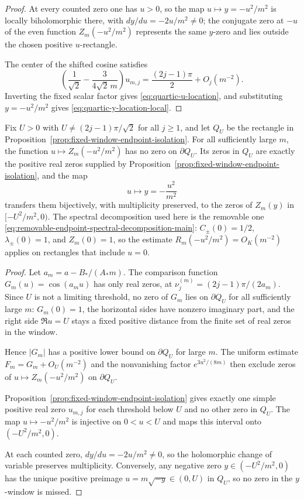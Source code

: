 \begin{proof}
At every counted zero one has $u>0$, so the map $u\mapsto y=-u^2/m^2$ is locally biholomorphic there, with $dy/du=-2u/m^2\ne0$; the conjugate zero at $-u$ of the even function $Z_m(-u^2/m^2)$ represents the same $y$-zero and lies outside the chosen positive $u$-rectangle.

The center of the shifted cosine satisfies
\[
\left(\frac1{\sqrt2}-\frac{3}{4\sqrt2\,m}\right)u_{m,j}
=
\frac{(2j-1)\pi}{2}+O_j(m^{-2}).
\]
Inverting the fixed scalar factor gives \eqref{eq:quartic-u-location}, and substituting $y=-u^2/m^2$ gives \eqref{eq:quartic-y-location-local}.\label{par:endpoint-theorem-inputs}
\end{proof}

\begin{lemma}\label{lem:endpoint-boundary-transfer}
Fix $U>0$ with $U\ne (2j-1)\pi/\sqrt2$ for all $j\ge1$, and let $Q_U$ be the rectangle in Proposition~\ref{prop:fixed-window-endpoint-isolation}.  For all sufficiently large $m$, the function $u\mapsto Z_m(-u^2/m^2)$ has no zero on $\partial Q_U$.  Its zeros in $Q_U$ are exactly the positive real zeros supplied by Proposition~\ref{prop:fixed-window-endpoint-isolation}, and the map
\[
u\longmapsto y=-\frac{u^2}{m^2}
\]
transfers them bijectively, with multiplicity preserved, to the zeros of $Z_m(y)$ in $[-U^2/m^2,0)$.
The spectral decomposition used here is the removable one \eqref{eq:removable-endpoint-spectral-decomposition-main}: \(C_\pm(0)=1/2\), \(\lambda_\pm(0)=1\), and \(Z_m(0)=1\), so the estimate \(R_m(-u^2/m^2)=O_K(m^{-2})\) applies on rectangles that include \(u=0\).
\end{lemma}
\begin{proof}
Let $a_m=a-B_*/(A_*m)$.  The comparison function $G_m(u)=\cos(a_mu)$ has only real zeros, at $\nu_j^{(m)}=(2j-1)\pi/(2a_m)$.  Since $U$ is not a limiting threshold, no zero of $G_m$ lies on $\partial Q_U$ for all sufficiently large $m$: $G_m(0)=1$, the horizontal sides have nonzero imaginary part, and the right side $\Re u=U$ stays a fixed positive distance from the finite set of real zeros in the window.

Hence $|G_m|$ has a positive lower bound on $\partial Q_U$ for large $m$.  The uniform estimate $F_m=G_m+O_U(m^{-2})$ and the nonvanishing factor $e^{3u^2/(8m)}$ then exclude zeros of $u\mapsto Z_m(-u^2/m^2)$ on $\partial Q_U$.

Proposition~\ref{prop:fixed-window-endpoint-isolation} gives exactly one simple positive real zero $u_{m,j}$ for each threshold below $U$ and no other zero in $Q_U$.  The map $u\mapsto -u^2/m^2$ is injective on $0<u<U$ and maps this interval onto $(-U^2/m^2,0)$.

At each counted zero, $dy/du=-2u/m^2\ne0$, so the holomorphic change of variable preserves multiplicity.  Conversely, any negative zero $y\in(-U^2/m^2,0)$ has the unique positive preimage $u=m\sqrt{-y}\in(0,U)$ in $Q_U$, so no zero in the $y$-window is missed.
\end{proof}

